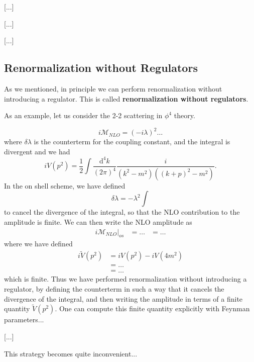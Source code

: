     [...]

    [...]

    [...]

\subsection{Renormalization without Regulators}

As we mentioned, in principle we can perform renormalization without introducing a regulator. This is called \textbf{renormalization without regulators}.

As an example, let us consider the 2-2 scattering in \(\phi^4\) theory.

\[
    i \mathcal{M}_{NLO} = (-i \lambda)^2 \dots
\]
where \(\delta \lambda\) is the counterterm for the coupling constant, and the integral is divergent and we had
\[
    i V(p^2) = \frac{1}{2} \int \frac{\mathrm{d}^4 k}{(2\pi)^4} \frac{i}{(k^2 - m^2)((k+p)^2 - m^2)}.
\]
In the on shell scheme, we have defined
\[
    \delta \lambda = - \lambda^2 \int
\]
to cancel the divergence of the integral, so that the NLO contribution to the amplitude is finite. We can then write the NLO amplitude as
\[
    \begin{aligned}
        i \mathcal{M}_{NLO} \big|_{os} & = \dots
                                       & = \dots
    \end{aligned}
\]
where we have defined
\[
    \begin{aligned}
        i \tilde{V}(p^2) & = i V(p^2) - i V(4m^2) \\
                         & = \dots                \\
                         & = \dots
    \end{aligned}
\]
which is finite. Thus we have performed renormalization without introducing a regulator, by defining the counterterm in such a way that it cancels the divergence of the integral, and then writing the amplitude in terms of a finite quantity \(\tilde{V}(p^2)\). One can compute this finite quantity explicitly with Feynman parameters...

    [...]

This strategy becomes quite inconvenient...

